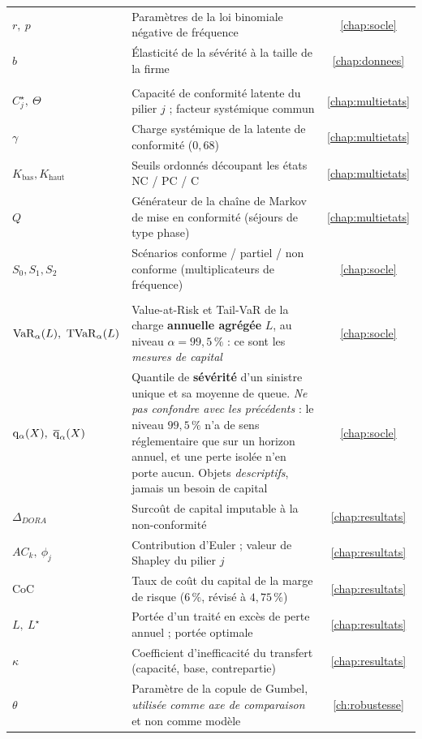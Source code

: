 {\begin{longtable}{>{\raggedright}p{3.3cm} >{\raggedright\arraybackslash}p{10.2cm} c}
$r,\ p$ & Paramètres de la loi binomiale négative de fréquence & \ref{chap:socle} \\
$b$ & Élasticité de la sévérité à la taille de la firme & \ref{chap:donnees} \\
\midrule
\multicolumn{3}{@{}l}{\emph{\textcolor{navy}{Conformité multi-états}}} \\
$C^\star_j,\ \Theta$ & Capacité de conformité latente du pilier $j$ ; facteur systémique commun & \ref{chap:multietats} \\
$\gamma$ & Charge systémique de la latente de conformité ($0{,}68$) & \ref{chap:multietats} \\
$K_{\text{bas}},K_{\text{haut}}$ & Seuils ordonnés découpant les états NC / PC / C & \ref{chap:multietats} \\
$Q$ & Générateur de la chaîne de Markov de mise en conformité (séjours de type phase) & \ref{chap:multietats} \\
$S_0,S_1,S_2$ & Scénarios conforme / partiel / non conforme (multiplicateurs de fréquence) & \ref{chap:socle} \\
\midrule
\multicolumn{3}{@{}l}{\emph{\textcolor{navy}{Capital, allocation et décision}}} \\
$\mathrm{VaR}_\alpha(L),\ \mathrm{TVaR}_\alpha(L)$ & Value-at-Risk et Tail-VaR de la charge \textbf{annuelle agrégée} $L$, au niveau $\alpha=99{,}5\,\%$ : ce sont les \emph{mesures de capital} & \ref{chap:socle} \\
$\mathrm{q}_\alpha(X),\ \overline{\mathrm{q}}_\alpha(X)$ & Quantile de \textbf{sévérité} d'un sinistre unique et sa moyenne de queue. \emph{Ne pas confondre avec les précédents} : le niveau $99{,}5\,\%$ n'a de sens réglementaire que sur un horizon annuel, et une perte isolée n'en porte aucun. Objets \emph{descriptifs}, jamais un besoin de capital & \ref{chap:socle} \\
$\Delta_{DORA}$ & Surcoût de capital imputable à la non-conformité & \ref{chap:resultats} \\
$AC_k,\ \phi_j$ & Contribution d'Euler ; valeur de Shapley du pilier $j$ & \ref{chap:resultats} \\
$\mathrm{CoC}$ & Taux de coût du capital de la marge de risque ($6\,\%$, révisé à $4{,}75\,\%$) & \ref{chap:resultats} \\
$L,\ L^\star$ & Portée d'un traité en excès de perte annuel ; portée optimale & \ref{chap:resultats} \\
$\kappa$ & Coefficient d'inefficacité du transfert (capacité, base, contrepartie) & \ref{chap:resultats} \\
$\theta$ & Paramètre de la copule de Gumbel, \emph{utilisée comme axe de comparaison} et non comme modèle & \ref{ch:robustesse} \\
\end{longtable}
}

\clearpage


